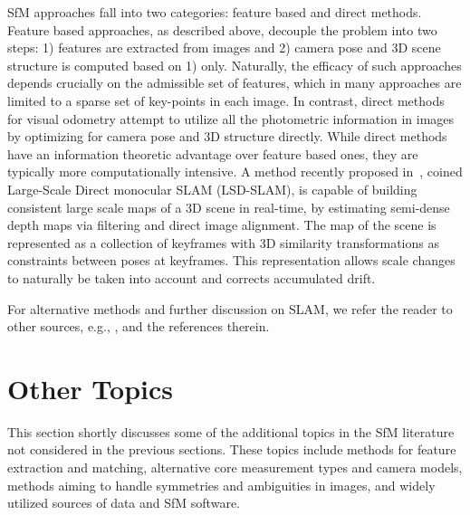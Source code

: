 \documentclass[10pt]{article}
\begin{document}
SfM approaches fall into two categories: feature based and direct methods. Feature based approaches, as described above, decouple the problem into two steps: 1) features are extracted from images and 2) camera pose and $3$D scene structure is computed based on 1) only. Naturally, the efficacy of such approaches depends crucially on the admissible set of features, which in many approaches are limited to a sparse set of key-points in each image. In contrast, direct methods for visual odometry attempt to utilize all the photometric information in images by optimizing for camera pose and $3$D structure directly. While direct methods have an information theoretic advantage over feature based ones, they are typically more computationally intensive. A method recently proposed in~\cite{LSDSLAM}, coined Large-Scale Direct monocular SLAM (LSD-SLAM), is capable of building consistent large scale maps of a $3$D scene in real-time, by estimating semi-dense depth maps via filtering and direct image alignment. The map of the scene is represented as a collection of keyframes with $3$D similarity transformations as constraints between poses at keyframes. This representation allows scale changes to naturally be taken into account and corrects accumulated drift. 

For alternative methods and further discussion on SLAM, we refer the reader to other sources, e.g., \cite{SLAMSurvey1,SLAMSurvey2,SLAMSurvey3}, and the references therein.

\section{Other Topics}
\label{sec:Misc}
This section shortly discusses some of the additional topics in the SfM literature not considered in the previous sections. These topics include methods for feature extraction and matching, alternative core measurement types and camera models, methods aiming to handle symmetries and ambiguities in images, and widely utilized sources of data and SfM software.
\end{document}
